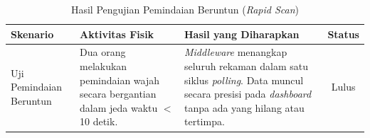 \begin{table}[htbp]
\centering
\caption{Hasil Pengujian Pemindaian Beruntun (\textit{Rapid Scan})}
\label{tab:test_rapid_scan}
\begin{tabular}{|l|p{4.5cm}|p{4cm}|c|}
\hline
\textbf{Skenario} & \textbf{Aktivitas Fisik} & \textbf{Hasil yang Diharapkan} & \textbf{Status} \\ \hline
Uji Pemindaian Beruntun & Dua orang melakukan pemindaian wajah secara bergantian dalam jeda waktu $<$ 10 detik. & \textit{Middleware} menangkap seluruh rekaman dalam satu siklus \textit{polling}. Data muncul secara presisi pada \textit{dashboard} tanpa ada yang hilang atau tertimpa. & Lulus \\ \hline
\end{tabular}
\end{table}